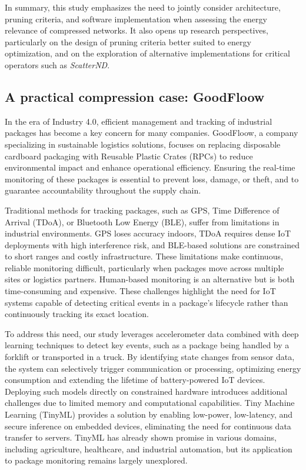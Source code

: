 \documentclass[11pt]{report}
\begin{document}
In summary, this study emphasizes the need to jointly consider architecture, pruning criteria, and software implementation when assessing the energy relevance of compressed networks. It also opens up research perspectives, particularly on the design of pruning criteria better suited to energy optimization, and on the exploration of alternative implementations for critical operators such as \textit{ScatterND}.


\subsection{A practical compression case: GoodFloow}


In the era of Industry 4.0, efficient management and tracking of industrial packages has become a key concern for many companies. GoodFloow, a company specializing in sustainable logistics solutions, focuses on replacing disposable cardboard packaging with Reusable Plastic Crates (RPCs) to reduce environmental impact and enhance operational efficiency. Ensuring the real-time monitoring of these packages is essential to prevent loss, damage, or theft, and to guarantee accountability throughout the supply chain.

Traditional methods for tracking packages, such as GPS, Time Difference of Arrival (TDoA), or Bluetooth Low Energy (BLE), suffer from limitations in industrial environments. GPS loses accuracy indoors, TDoA requires dense IoT deployments with high interference risk, and BLE-based solutions are constrained to short ranges and costly infrastructure. These limitations make continuous, reliable monitoring difficult, particularly when packages move across multiple sites or logistics partners. Human-based monitoring is an alternative but is both time-consuming and expensive. These challenges highlight the need for IoT systems capable of detecting critical events in a package's lifecycle rather than continuously tracking its exact location.

To address this need, our study leverages accelerometer data combined with deep learning techniques to detect key events, such as a package being handled by a forklift or transported in a truck. By identifying state changes from sensor data, the system can selectively trigger communication or processing, optimizing energy consumption and extending the lifetime of battery-powered IoT devices. Deploying such models directly on constrained hardware introduces additional challenges due to limited memory and computational capabilities. Tiny Machine Learning (TinyML) provides a solution by enabling low-power, low-latency, and secure inference on embedded devices, eliminating the need for continuous data transfer to servers. TinyML has already shown promise in various domains, including agriculture, healthcare, and industrial automation, but its application to package monitoring remains largely unexplored.
\end{document}
